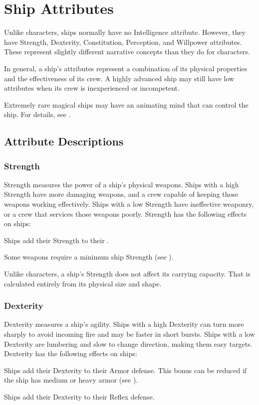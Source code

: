 \section{Ship Attributes}
    Unlike characters, ships normally have no Intelligence attribute.
    However, they have Strength, Dexterity, Constitution, Perception, and Willpower attributes.
    These represent slightly different narrative concepts than they do for characters.

    In general, a ship's attributes represent a combination of its physical properties and the effectiveness of its crew.
    A highly advanced ship may still have low attributes when its crew is inexperienced or incompetent.

    Extremely rare magical ships may have an animating mind that can control the ship.
    For details, see .

    \subsection{Attribute Descriptions}

    \subsubsection{Strength}
        Strength measures the power of a ship's physical weapons.
        Ships with a high Strength have more damaging weapons, and a crew capable of keeping those weapons working effectively.
        Ships with a low Strength have ineffective weaponry, or a crew that services those weapons poorly.
        Strength has the following effects on ships:
        \begin{raggeditemize}
            \item Ships add their Strength to their .
            \item Some weapons require a minimum ship Strength (see ).
        \end{raggeditemize}

        Unlike characters, a ship's Strength does not affect its carrying capacity.
        That is calculated entirely from its physical size and shape.

    \subsubsection{Dexterity}
        Dexterity measures a ship's agility.
        Ships with a high Dexterity can turn more sharply to avoid incoming fire and may be faster in short bursts.
        Ships with a low Dexterity are lumbering and slow to change direction, making them easy targets.
        Dexterity has the following effects on ships:
        \begin{raggeditemize}
            \item Ships add their Dexterity to their Armor defense.
                This bonus can be reduced if the ship has medium or heavy armor (see ).
            \item Ships add their Dexterity to their Reflex defense.
        \end{raggeditemize}

